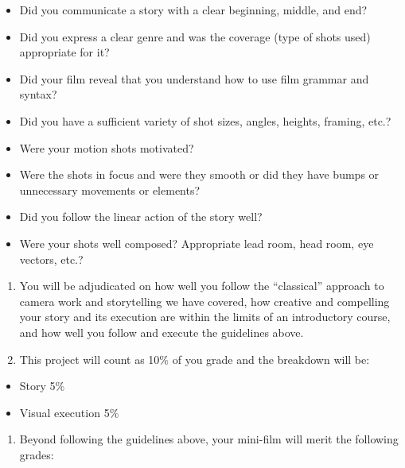 \documentclass[
]{book}
\providecommand{\tightlist}{%
  \setlength{\itemsep}{0pt}\setlength{\parskip}{0pt}}
\begin{document}
\begin{assessment}
\begin{itemize}
\tightlist
\item
  Did you communicate a story with a clear beginning, middle, and end?\\
\item
  Did you express a clear genre and was the coverage (type of shots used) appropriate for it?\\
\item
  Did your film reveal that you understand how to use film grammar and syntax?\\
\item
  Did you have a sufficient variety of shot sizes, angles, heights, framing, etc.?\\
\item
  Were your motion shots motivated?\\
\item
  Were the shots in focus and were they smooth or did they have bumps or unnecessary movements or elements?\\
\item
  Did you follow the linear action of the story well?\\
\item
  Were your shots well composed? Appropriate lead room, head room, eye vectors, etc.?
\end{itemize}

\begin{enumerate}
\def\labelenumi{\arabic{enumi}.}
\tightlist
\item
  You will be adjudicated on how well you follow the ``classical'' approach to camera work and storytelling we have covered, how creative and compelling your story and its execution are within the limits of an introductory course, and how well you follow and execute the guidelines above.\\
\item
  This project will count as 10\% of you grade and the breakdown will be:
\end{enumerate}

\begin{itemize}
\tightlist
\item
  Story 5\%\\
\item
  Visual execution 5\%\\
\end{itemize}

\begin{enumerate}
\def\labelenumi{\arabic{enumi}.}
\setcounter{enumi}{2}
\tightlist
\item
  Beyond following the guidelines above, your mini-film will merit the following grades:
\end{enumerate}


\end{assessment}
\end{document}
